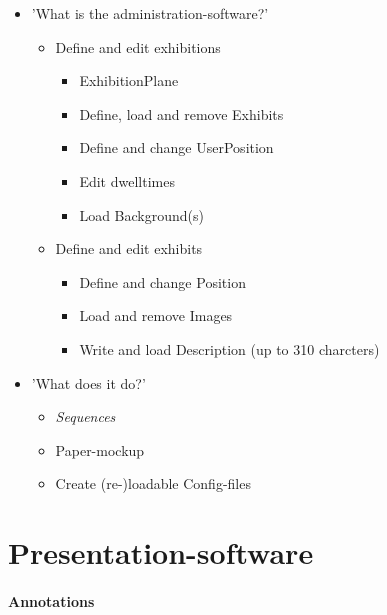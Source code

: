 \begin{itemize}
	\item 'What is the administration-software?'
	\begin{itemize}
		\item Define and edit exhibitions
		\begin{itemize}
			\item ExhibitionPlane
			\item Define, load and remove Exhibits
			\item Define and change UserPosition
			\item Edit dwelltimes
			\item Load Background(s)
		\end{itemize}
		\item Define and edit exhibits
		\begin{itemize}
			\item Define and change Position
			\item Load and remove Images
			\item Write and load Description (up to 310 charcters)
		\end{itemize}
	\end{itemize}
	\item 'What does it do?'
	\begin{itemize}
		\item \textit{Sequences}
		\item Paper-mockup
		\item Create (re-)loadable Config-files
	\end{itemize}
\end{itemize}


\section{Presentation-software}
\label{implementation_presentation}

\paragraph{Annotations}

